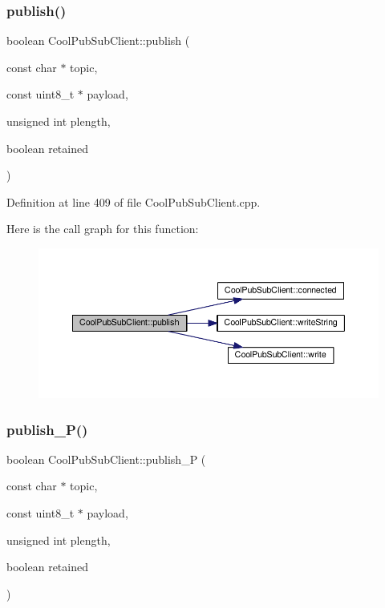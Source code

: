 \subsubsection{\texorpdfstring{publish()}{publish()}\hspace{0.1cm}{\footnotesize\ttfamily [4/4]}}
{\footnotesize\ttfamily boolean Cool\+Pub\+Sub\+Client\+::publish (\begin{DoxyParamCaption}\item[{const char $\ast$}]{topic,  }\item[{const uint8\+\_\+t $\ast$}]{payload,  }\item[{unsigned int}]{plength,  }\item[{boolean}]{retained }\end{DoxyParamCaption})}



Definition at line 409 of file Cool\+Pub\+Sub\+Client.\+cpp.

Here is the call graph for this function\+:\nopagebreak
\begin{figure}[H]
\begin{center}
\leavevmode
\includegraphics[width=350pt]{class_cool_pub_sub_client_adef968760eb87b70e3fed03e60da76f7_cgraph}
\end{center}
\end{figure}
\mbox{\label{class_cool_pub_sub_client_a55458d47cf01f590e9b6647d5a418ab6}} 
\subsubsection{\texorpdfstring{publish\+\_\+\+P()}{publish\_P()}}
{\footnotesize\ttfamily boolean Cool\+Pub\+Sub\+Client\+::publish\+\_\+P (\begin{DoxyParamCaption}\item[{const char $\ast$}]{topic,  }\item[{const uint8\+\_\+t $\ast$}]{payload,  }\item[{unsigned int}]{plength,  }\item[{boolean}]{retained }\end{DoxyParamCaption})}



